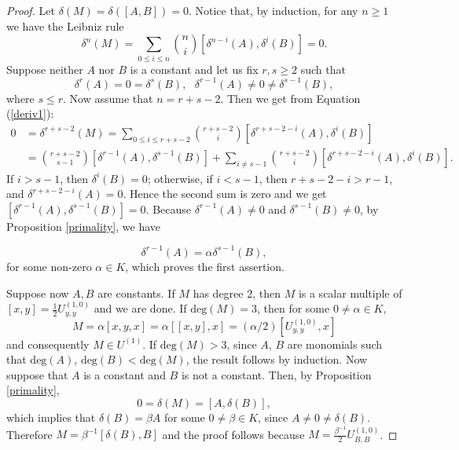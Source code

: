 \documentclass{cimart}
\begin{document}
\begin{proof}
Let $\delta(M)=\delta([A,B])=0$. Notice that, by induction, for any $n\geq1$ we have the Leibniz rule
\begin{equation}\label{deriv1}
\delta^n(M)=\sum_{0\leq i\leq n}\binom{n}{i}[\delta^{n-i}(A),\delta^i(B)]=0.
\end{equation}
Suppose neither $A$ nor $B$ is a constant and let us fix $r,s\geq2$
such that
\[
\delta^r(A)=0=\delta^s(B), \ \ \ \delta^{r-1}(A)\neq0\neq\delta^{s-1}(B),
\]
where $s\leq r$. Now assume that $n=r+s-2$. Then we get from Equation (\ref{deriv1}):
\begin{align}
0&=\delta^{r+s-2}(M)=\sum_{0\leq i\leq r+s-2}\binom{r+s-2}{i}[\delta^{{r+s-2}-i}(A),\delta^i(B)]\nonumber\\
&=\binom{r+s-2}{s-1}[\delta^{r-1}(A),\delta^{s-1}(B)]+\sum_{i\neq s-1}\binom{r+s-2}{i}[\delta^{{r+s-2}-i}(A),\delta^i(B)].\nonumber
\end{align}
If $i>s-1$, then $\delta^i(B)=0$; otherwise, if $i<s-1$, then ${r+s-2}-i>r-1$, and $\delta^{{r+s-2}-i}(A)=0$. Hence the second sum is zero and we get
$[\delta^{r-1}(A),\delta^{s-1}(B)]=0$.
Because $\delta^{r-1}(A)\neq0$ and $\delta^{s-1}(B)\neq0$, by Proposition \ref{primality}, we have

\begin{equation}\label{goodrel}
 \delta^{r-1}(A)=\alpha\delta^{s-1}(B),   
\end{equation}
for some non-zero $\alpha\in K$, 
which proves the first assertion.

Suppose now $A,B$ are constants. If $M$ has degree 2, then $M$ is a scalar multiple of $[x,y]=\frac{1}{2}U_{y,y}^{(1,0)}$ and we are done. If $\mbox{deg}(M) = 3$, then for some $0\neq\alpha\in K$,
\[
M = \alpha [x, y, x] = \alpha [[x, y], x]=(\alpha/2)[U^{(1,0)}_{y,y}, x]
\]
and consequently $M\in U^{(1)}$. If $\mbox{deg}(M)>3$, since $A$, $B$ are monomials such that $\mbox{deg}(A)$, $\mbox{deg}(B) < \mbox{deg}(M)$, the result follows by induction. Now suppose that $A$ is a constant and $B$ is not a constant. Then, by Proposition \ref{primality},
\[
0 = \delta(M) = [A, \delta(B)],
\]
which implies that $\delta(B) = \beta A$ for some $0\neq\beta\in K$, since $A \neq 0\neq\delta(B)$. Therefore $M = \beta^{-1} [\delta(B), B]$ and the proof follows because $M=\frac{\beta^{-1}}{2}U_{B,B}^{(1,0)}$. 
\end{proof}
\end{document}
